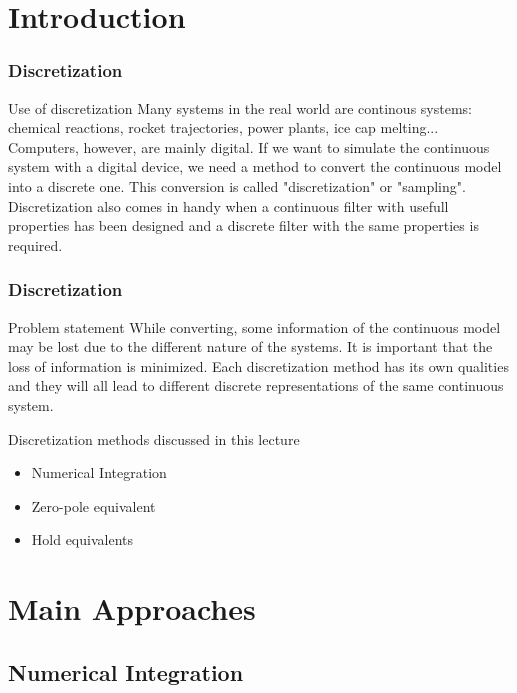 \section{Introduction}

\begin{frame}
	\frametitle{Discretization}
	\begin{block}{Use of discretization}
		Many systems in the real world are continous systems: chemical reactions, rocket trajectories, power plants, ice cap melting... Computers, however, are mainly digital. If we want to simulate the continuous system with a digital device, we need a method to convert the continuous model into a discrete one.  This conversion is called "discretization" or "sampling". Discretization also comes in handy when a continuous filter with usefull properties has been designed and a discrete filter with the same properties is required.
	\end{block}
\end{frame}

\begin{frame}
	\frametitle{Discretization}
	\begin{block}{Problem statement}
		While converting, some information of the continuous model may be lost due to the different nature of the systems. It is important that the loss of information is minimized. Each discretization method has its own qualities and they will all lead to different discrete representations of the same continuous system.
	\end{block}
	
	\begin{block}{Discretization methods discussed in this lecture}
		\begin{itemize}
			\item Numerical Integration
			\item Zero-pole equivalent
			\item Hold equivalents
		\end{itemize}
	\end{block}
\end{frame}

\section{Main Approaches}
\subsection{Numerical Integration}

